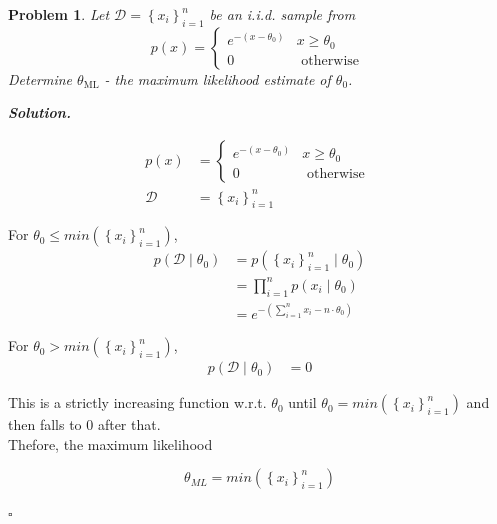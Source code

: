 \documentclass[12pt]{article}
\newtheorem{problem}{Problem}
\newenvironment{solution}[1][\it{Solution}]{\textbf{#1. } }{$\square$}
\begin{document}
\begin{problem}
Let $\mathcal{D}=\left\{x_{i}\right\}_{i=1}^{n}$ be an i.i.d. sample from
$$
p(x)=\left\{\begin{array}{ll}
e^{-\left(x-\theta_{0}\right)} & x \geq \theta_{0} \\
0 & \text { otherwise }
\end{array}\right.
$$
Determine $\theta_{\mathrm{ML}}$ - the maximum likelihood estimate of $\theta_{0}$.
\end{problem}
\begin{solution}

\begin{align*}
p(x)&=\left\{\begin{array}{ll}
e^{-\left(x-\theta_{0}\right)} & x \geq \theta_{0} \\
0 & \text { otherwise }
\end{array}\right.\\
\mathcal{D}&=\left\{x_{i}\right\}_{i=1}^{n}
\end{align*}

For $\theta_0 \le min\left(\left\{x_i\right\}_{i=1}^{n}\right)$, 
\begin{align*}
p\left(\mathcal{D} \mid \theta_0 \right) &= p\left(\left\{x_{i}\right\}_{i=1}^{n} \mid \theta_0\right)\\
&= \prod_{i=1}^{n}p\left(x_i \mid \theta_0\right)\\
&= e^{-\left(\sum_{i=1}^{n}x_i-n \cdot \theta_0\right)}
\end{align*}

For $\theta_0 > min\left(\left\{x_i\right\}_{i=1}^{n}\right)$, 
\begin{align*}
p\left(\mathcal{D} \mid \theta_0 \right) &= 0
\end{align*}

This is a strictly increasing function w.r.t.  $\theta_0$ until $\theta_0 = min\left(\left\{x_i\right\}_{i=1}^{n}\right)$ and then falls to $0$ after that.\\

Thefore, the maximum likelihood

$$\theta_{ML} = min\left(\left\{x_i\right\}_{i=1}^{n}\right)$$

\end{solution}
\end{document}

